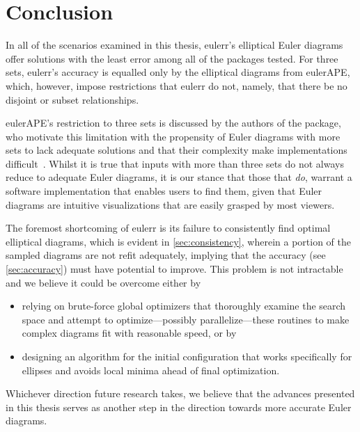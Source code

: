 \documentclass[
  oneside,
  openany,
  numbers=noendperiod,
  parskip=half,
  bibliography=totoc
]{scrbook}\usepackage[]{graphicx}\usepackage{xcolor}
\newcommand{\pkg}[1]{{\fontseries{b}\selectfont #1}}
\begin{document}
\section{Conclusion}
\label{sec:conclusion}

In all of the scenarios examined in this thesis,
\pkg{eulerr}'s elliptical Euler diagrams offer solutions with the least error
among all of the packages
tested. For three sets, \pkg{eulerr}'s accuracy is equalled only by the elliptical diagrams from
\pkg{eulerAPE}, which, however, impose restrictions that
\pkg{eulerr} do not, namely, that there be no disjoint or subset relationships.

\pkg{eulerAPE}'s restriction to three sets is discussed by the authors of the
package, who motivate this limitation with the propensity of Euler diagrams with
more sets to lack adequate solutions and that their complexity make
implementations difficult~\citep{Micallef_2013}. Whilst it is true that
inputs with more than three sets do not always reduce to adequate Euler diagrams,
it is our stance that those that \emph{do}, warrant a software implementation that
enables users to find them, given that Euler diagrams are intuitive
visualizations that are easily grasped by most viewers.

The foremost shortcoming of \pkg{eulerr} is its failure to consistently
find optimal elliptical diagrams, which is evident in \cref{sec:consistency},
wherein a portion of the sampled diagrams are not refit adequately,
implying that the accuracy (see \cref{sec:accuracy})
must have potential to improve. This problem is not intractable and we
believe it could be overcome either by
\begin{itemize}
\item relying on brute-force global optimizers that thoroughly examine
the search space and attempt to optimize---possibly parallelize---these routines
to make complex diagrams fit with reasonable speed, or by
\item designing an algorithm for the initial configuration that works
specifically for ellipses and avoids local minima ahead of final
optimization.
\end{itemize}
Whichever direction future research takes, we believe that the advances
presented in this thesis serves as another step in the direction towards more
accurate Euler diagrams.
\end{document}
